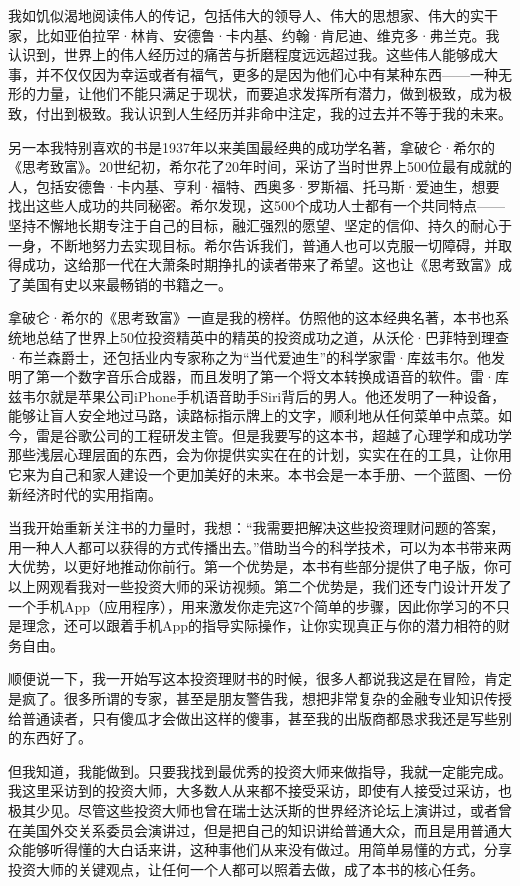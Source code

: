 我如饥似渴地阅读伟人的传记，包括伟大的领导人、伟大的思想家、伟大的实干家，比如亚伯拉罕·林肯、安德鲁·卡内基、约翰·肯尼迪、维克多·弗兰克。我认识到，世界上的伟人经历过的痛苦与折磨程度远远超过我。这些伟人能够成大事，并不仅仅因为幸运或者有福气，更多的是因为他们心中有某种东西——一种无形的力量，让他们不能只满足于现状，而要追求发挥所有潜力，做到极致，成为极致，付出到极致。我认识到人生经历并非命中注定，我的过去并不等于我的未来。

另一本我特别喜欢的书是1937年以来美国最经典的成功学名著，拿破仑·希尔的《思考致富》。20世纪初，希尔花了20年时间，采访了当时世界上500位最有成就的人，包括安德鲁·卡内基、亨利·福特、西奥多·罗斯福、托马斯·爱迪生，想要找出这些人成功的共同秘密。希尔发现，这500个成功人士都有一个共同特点——坚持不懈地长期专注于自己的目标，融汇强烈的愿望、坚定的信仰、持久的耐心于一身，不断地努力去实现目标。希尔告诉我们，普通人也可以克服一切障碍，并取得成功，这给那一代在大萧条时期挣扎的读者带来了希望。这也让《思考致富》成了美国有史以来最畅销的书籍之一。

拿破仑·希尔的《思考致富》一直是我的榜样。仿照他的这本经典名著，本书也系统地总结了世界上50位投资精英中的精英的投资成功之道，从沃伦·巴菲特到理查·布兰森爵士，还包括业内专家称之为“当代爱迪生”的科学家雷·库兹韦尔。他发明了第一个数字音乐合成器，而且发明了第一个将文本转换成语音的软件。雷·库兹韦尔就是苹果公司iPhone手机语音助手Siri背后的男人。他还发明了一种设备，能够让盲人安全地过马路，读路标指示牌上的文字，顺利地从任何菜单中点菜。如今，雷是谷歌公司的工程研发主管。但是我要写的这本书，超越了心理学和成功学那些浅层心理层面的东西，会为你提供实实在在的计划，实实在在的工具，让你用它来为自己和家人建设一个更加美好的未来。本书会是一本手册、一个蓝图、一份新经济时代的实用指南。

当我开始重新关注书的力量时，我想：“我需要把解决这些投资理财问题的答案，用一种人人都可以获得的方式传播出去。”借助当今的科学技术，可以为本书带来两大优势，以更好地推动你前行。第一个优势是，本书有些部分提供了电子版，你可以上网观看我对一些投资大师的采访视频。第二个优势是，我们还专门设计开发了一个手机App（应用程序），用来激发你走完这7个简单的步骤，因此你学习的不只是理念，还可以跟着手机App的指导实际操作，让你实现真正与你的潜力相符的财务自由。

顺便说一下，我一开始写这本投资理财书的时候，很多人都说我这是在冒险，肯定是疯了。很多所谓的专家，甚至是朋友警告我，想把非常复杂的金融专业知识传授给普通读者，只有傻瓜才会做出这样的傻事，甚至我的出版商都恳求我还是写些别的东西好了。

但我知道，我能做到。只要我找到最优秀的投资大师来做指导，我就一定能完成。我这里采访到的投资大师，大多数人从来都不接受采访，即使有人接受过采访，也极其少见。尽管这些投资大师也曾在瑞士达沃斯的世界经济论坛上演讲过，或者曾在美国外交关系委员会演讲过，但是把自己的知识讲给普通大众，而且是用普通大众能够听得懂的大白话来讲，这种事他们从来没有做过。用简单易懂的方式，分享投资大师的关键观点，让任何一个人都可以照着去做，成了本书的核心任务。

